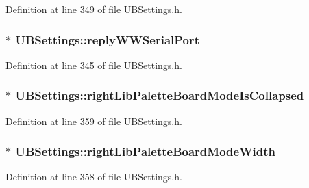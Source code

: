 Definition at line 349 of file U\-B\-Settings.\-h.

\hypertarget{class_u_b_settings_adaf41115f2bd2098819ae25afb294494}{
\subsubsection[{reply\-W\-W\-Serial\-Port}]{$\ast$ U\-B\-Settings\-::reply\-W\-W\-Serial\-Port}}\label{db/d66/class_u_b_settings_adaf41115f2bd2098819ae25afb294494}


Definition at line 345 of file U\-B\-Settings.\-h.

\hypertarget{class_u_b_settings_a839314db2375f5134f5c761232686321}{
\subsubsection[{right\-Lib\-Palette\-Board\-Mode\-Is\-Collapsed}]{$\ast$ U\-B\-Settings\-::right\-Lib\-Palette\-Board\-Mode\-Is\-Collapsed}}\label{db/d66/class_u_b_settings_a839314db2375f5134f5c761232686321}


Definition at line 359 of file U\-B\-Settings.\-h.

\hypertarget{class_u_b_settings_a3afa5ce4240c63f9932185937c6410c5}{
\subsubsection[{right\-Lib\-Palette\-Board\-Mode\-Width}]{$\ast$ U\-B\-Settings\-::right\-Lib\-Palette\-Board\-Mode\-Width}}\label{db/d66/class_u_b_settings_a3afa5ce4240c63f9932185937c6410c5}


Definition at line 358 of file U\-B\-Settings.\-h.

